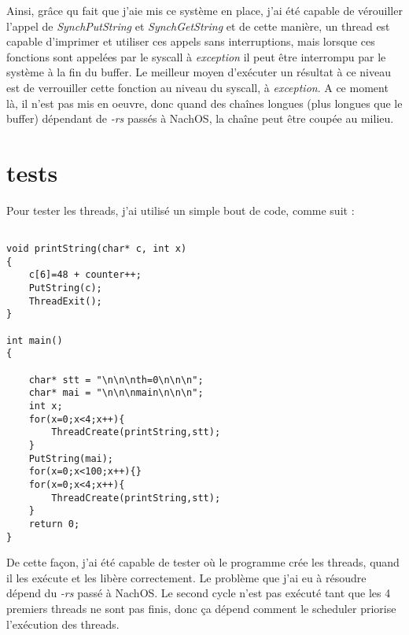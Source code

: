 \documentclass{article}
\begin{document}
Ainsi, grâce qu fait que j'aie mis ce système en place, j'ai été capable de vérouiller l'appel de \textit{SynchPutString} et \textit{SynchGetString} et de cette manière, un thread est capable d'imprimer et utiliser ces appels sans interruptions, mais lorsque ces fonctions sont appelées par le syscall à \textit{exception} il peut être interrompu par le système à la fin du buffer. Le meilleur moyen d'exécuter un résultat à ce niveau est de verrouiller cette fonction au niveau du syscall, à \textit{exception}. A ce moment là, il n'est pas mis en oeuvre, donc quand des chaînes longues (plus longues que le buffer) dépendant de \textit{-rs} passés à NachOS, la chaîne peut être coupée au milieu. 

\section{tests}

Pour tester les threads, j'ai utilisé un simple bout de code, comme suit : 

\begin{verbatim}

void printString(char* c, int x)
{
    c[6]=48 + counter++;
    PutString(c);
    ThreadExit();
}

int main()
{

    char* stt = "\n\n\nth=0\n\n\n";
    char* mai = "\n\n\nmain\n\n\n";
    int x;
    for(x=0;x<4;x++){
        ThreadCreate(printString,stt);
    }
    PutString(mai);
    for(x=0;x<100;x++){}
    for(x=0;x<4;x++){
        ThreadCreate(printString,stt);
    } 
    return 0;
}

\end{verbatim}

De cette façon, j'ai été capable de tester où le programme crée les threads, quand il les exécute et les libère correctement. 
Le problème que j'ai eu à résoudre dépend du \textit{-rs} passé à NachOS. Le second cycle n'est pas exécuté tant que les 4 premiers threads ne sont pas finis, donc ça dépend comment le scheduler priorise l'exécution des threads. 
\end{document}
